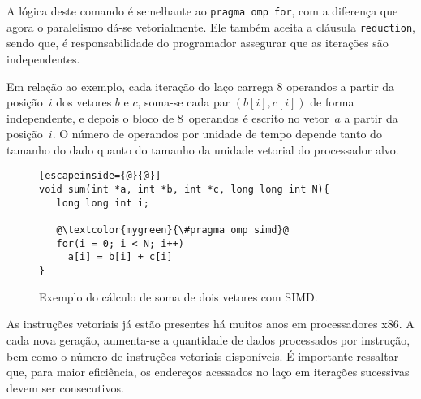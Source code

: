 A lógica deste comando é semelhante ao \texttt{pragma omp for}, com a diferença que agora o paralelismo dá-se vetorialmente. Ele também aceita a cláusula \texttt{reduction}, sendo que, é responsabilidade do programador assegurar que as iterações são independentes.

Em relação ao exemplo, cada iteração do laço carrega 8 operandos a partir da posição~$i$ dos vetores $b$ e $c$, soma-se cada par \mbox{$(b[i], c[i])$} de forma independente, e depois o bloco de 8~operandos é escrito no vetor~$a$ a partir da posição~$i$. O número de operandos por unidade de tempo depende tanto do tamanho do dado quanto do tamanho da unidade vetorial do processador alvo.

\begin{figure}[!htb]
\centering
\begin{lstlisting}[escapeinside={@}{@}]
void sum(int *a, int *b, int *c, long long int N){
   long long int i;

   @\textcolor{mygreen}{\#pragma omp simd}@
   for(i = 0; i < N; i++)
     a[i] = b[i] + c[i]
}
\end{lstlisting}
\caption{Exemplo do cálculo de soma de dois vetores com SIMD.}
\label{fig:omp:simd}
\end{figure}

As instruções vetoriais já estão presentes há muitos anos em processadores x86. A cada nova geração, aumenta-se a quantidade de dados processados por instrução, bem como o número de instruções vetoriais disponíveis. É importante ressaltar que, para maior eficiência, os endereços acessados no laço em iterações sucessivas devem ser consecutivos.
